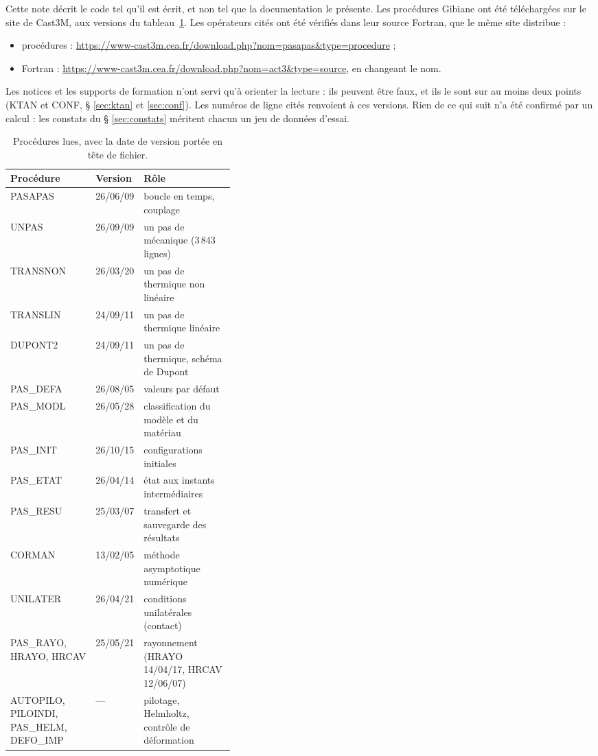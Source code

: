 \documentclass[11pt,a4paper]{article}
\numberwithin{equation}{section}
\newcommand{\pr}[1]{\textsf{#1}}                        %
\begin{document}
Cette note décrit le code tel qu'il est écrit, et non tel que la documentation le présente.
Les procédures Gibiane ont été téléchargées sur le site de Cast3M, aux versions du tableau~\ref{tab:versions}.
Les opérateurs cités ont été vérifiés dans leur source Fortran, que le même site distribue :
\begin{itemize}
\item procédures : \url{https://www-cast3m.cea.fr/download.php?nom=pasapas&type=procedure} ;
\item Fortran : \url{https://www-cast3m.cea.fr/download.php?nom=act3&type=source}, en changeant le nom.
\end{itemize}
Les notices et les supports de formation n'ont servi qu'à orienter la lecture : ils peuvent être faux, et ils le sont sur au moins deux points (KTAN et CONF, § \ref{sec:ktan} et \ref{sec:conf}).
Les numéros de ligne cités renvoient à ces versions.
Rien de ce qui suit n'a été confirmé par un calcul : les constats du § \ref{sec:constats} méritent chacun un jeu de données d'essai.

\begin{table}[ht]
\centering\small
\caption{Procédures lues, avec la date de version portée en tête de fichier.}
\label{tab:versions}
\begin{tabularx}{\linewidth}{@{}>{\raggedright\arraybackslash}p{0.38\linewidth}l>{\raggedright\arraybackslash}X@{}}
\toprule
Procédure & Version & Rôle\\
\midrule
\pr{PASAPAS}  & 26/06/09 & boucle en temps, couplage\\
\pr{UNPAS}    & 26/09/09 & un pas de mécanique (3\,843 lignes)\\
\pr{TRANSNON} & 26/03/20 & un pas de thermique non linéaire\\
\pr{TRANSLIN} & 24/09/11 & un pas de thermique linéaire\\
\pr{DUPONT2}  & 24/09/11 & un pas de thermique, schéma de Dupont\\
\pr{PAS\_DEFA} & 26/08/05 & valeurs par défaut\\
\pr{PAS\_MODL} & 26/05/28 & classification du modèle et du matériau\\
\pr{PAS\_INIT} & 26/10/15 & configurations initiales\\
\pr{PAS\_ETAT} & 26/04/14 & état aux instants intermédiaires\\
\pr{PAS\_RESU} & 25/03/07 & transfert et sauvegarde des résultats\\
\pr{CORMAN}   & 13/02/05 & méthode asymptotique numérique\\
\pr{UNILATER} & 26/04/21 & conditions unilatérales (contact)\\
\pr{PAS\_RAYO}, \pr{HRAYO}, \pr{HRCAV} & 25/05/21 & rayonnement (\pr{HRAYO} 14/04/17, \pr{HRCAV} 12/06/07)\\
\pr{AUTOPILO}, \pr{PILOINDI}, \pr{PAS\_HELM}, \pr{DEFO\_IMP} & — & pilotage, Helmholtz, contrôle de déformation\\
\bottomrule
\end{tabularx}
\end{table}
\end{document}
